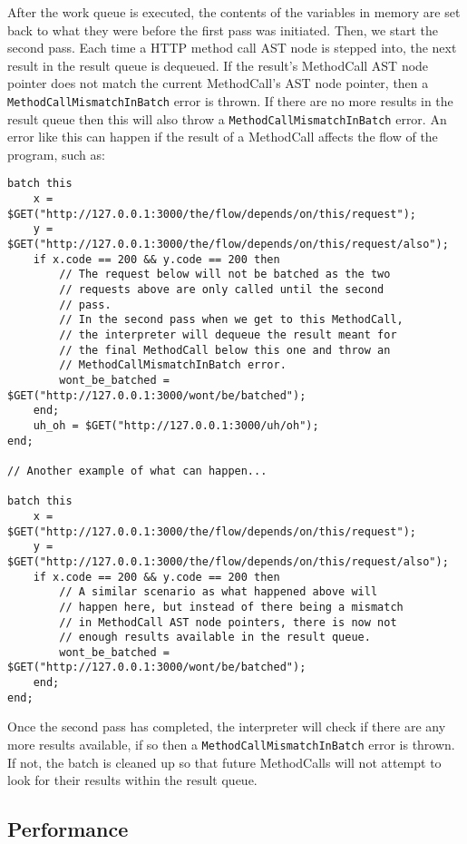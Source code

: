 After the work queue is executed, the contents of the variables in memory are set back to what they were before the first pass was initiated. Then, we start the second pass. Each time a HTTP method call AST node is stepped into, the next result in the result queue is dequeued. If the result's MethodCall AST node pointer does not match the current MethodCall's AST node pointer, then a \verb|MethodCallMismatchInBatch| error is thrown. If there are no more results in the result queue then this will also throw a \verb|MethodCallMismatchInBatch| error. An error like this can happen if the result of a MethodCall affects the flow of the program, such as:

\begin{verbatim}
batch this
    x = $GET("http://127.0.0.1:3000/the/flow/depends/on/this/request");
    y = $GET("http://127.0.0.1:3000/the/flow/depends/on/this/request/also");
    if x.code == 200 && y.code == 200 then
        // The request below will not be batched as the two
        // requests above are only called until the second
        // pass.
        // In the second pass when we get to this MethodCall,
        // the interpreter will dequeue the result meant for
        // the final MethodCall below this one and throw an
        // MethodCallMismatchInBatch error.
        wont_be_batched = $GET("http://127.0.0.1:3000/wont/be/batched");
    end;
    uh_oh = $GET("http://127.0.0.1:3000/uh/oh");
end;

// Another example of what can happen...

batch this
    x = $GET("http://127.0.0.1:3000/the/flow/depends/on/this/request");
    y = $GET("http://127.0.0.1:3000/the/flow/depends/on/this/request/also");
    if x.code == 200 && y.code == 200 then
        // A similar scenario as what happened above will
        // happen here, but instead of there being a mismatch
        // in MethodCall AST node pointers, there is now not
        // enough results available in the result queue.
        wont_be_batched = $GET("http://127.0.0.1:3000/wont/be/batched");
    end;
end;
\end{verbatim}

Once the second pass has completed, the interpreter will check if there are any more results available, if so then a \verb|MethodCallMismatchInBatch| error is thrown. If not, the batch is cleaned up so that future MethodCalls will not attempt to look for their results within the result queue.

\subsection{Performance}
\label{sec:batching-performance}

